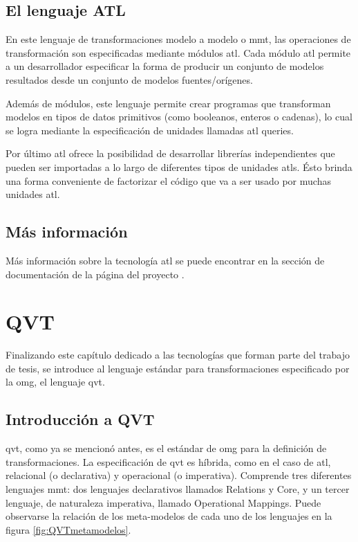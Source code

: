 \documentclass[a4paper,12pt,oneside,spanish]{book}
\begin{document}
\subsection{El lenguaje ATL}

En este lenguaje de transformaciones modelo a modelo o \gls{mmt}, las operaciones de transformación son especificadas mediante módulos \gls{atl}. Cada módulo \gls{atl} permite a un desarrollador especificar la forma de producir un conjunto de modelos resultados desde un conjunto de modelos fuentes/orígenes. 

Además de módulos, este lenguaje permite crear programas que transforman modelos en tipos de datos primitivos (como booleanos, enteros o cadenas), lo cual se logra mediante la especificación de unidades llamadas \gls{atl} queries.

Por último \gls{atl} ofrece la posibilidad de desarrollar librerías independientes que pueden ser importadas a lo largo de diferentes tipos de unidades \glspl{atl}. Ésto brinda una forma conveniente de factorizar el código que va a ser usado por muchas unidades \gls{atl}.


\subsection{Más información}

Más información sobre la tecnología \gls{atl} se puede encontrar en la sección de documentación de la página del proyecto \cite[\url{www.eclipse.org/atl/}]{ATL}.


\section{QVT}
\label{sec:QVT}

Finalizando este capítulo dedicado a las tecnologías que forman parte del trabajo de tesis, se introduce al lenguaje estándar para transformaciones especificado por la \gls{omg}, el lenguaje \gls{qvt}.


\subsection{Introducción a QVT}

\gls{qvt}, como ya se mencionó antes, es el estándar de \gls{omg} para la definición de transformaciones. La especificación de \gls{qvt} es híbrida, como en el caso de \gls{atl}, relacional (o declarativa) y operacional (o imperativa). Comprende tres diferentes lenguajes \gls{mmt}: dos lenguajes declarativos llamados \textsf{Relations} y \textsf{Core}, y un tercer lenguaje, de naturaleza imperativa, llamado \textsf{Operational Mappings}. Puede observarse la relación de los meta-modelos de cada uno de los lenguajes en la figura \ref{fig:QVTmetamodelos}. 
\end{document}
